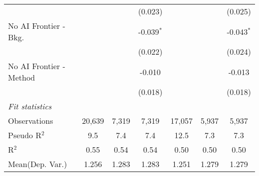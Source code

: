 \begin{tabular}{lcccccc}
                           &               &         & (0.023)       &               &         & (0.025)\\   
   No AI Frontier - Bkg.   &               &         & -0.039$^{*}$  &               &         & -0.043$^{*}$\\   
                           &               &         & (0.022)       &               &         & (0.024)\\   
   No AI Frontier - Method &               &         & -0.010        &               &         & -0.013\\   
                           &               &         & (0.018)       &               &         & (0.018)\\   
   \midrule
   \emph{Fit statistics}\\
   Observations            & 20,639        & 7,319   & 7,319         & 17,057        & 5,937   & 5,937\\  
   Pseudo R$^2$            & 9.5           & 7.4     & 7.4           & 12.5          & 7.3     & 7.3\\  
   R$^2$                   & 0.55          & 0.54    & 0.54          & 0.50          & 0.50    & 0.50\\  
Mean(Dep. Var.) & 1.256 & 1.283 & 1.283 & 1.251 & 1.279 & 1.279 \\
   

\end{tabular}
